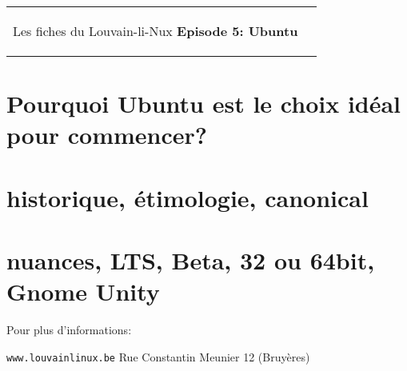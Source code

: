 



\begin{tabular}{p{14cm}r}
    \begin{center}{\Large Les fiches du Louvain-li-Nux\linebreak \linebreak
    \LARGE \textbf{Episode 5: Ubuntu}}\end{center}
		&
	\usebox{\logollnux}
\end{tabular}


\section*{Pourquoi Ubuntu est le choix idéal pour commencer?}



\section*{historique, étimologie, canonical}



\section*{nuances, LTS, Beta, 32 ou 64bit, Gnome Unity}



Pour plus d'informations:

\begin{center}\texttt{www.louvainlinux.be} \hspace{0.5cm}Rue Constantin Meunier 12 (Bruyères)\end{center}
                                                                                                                       
		
